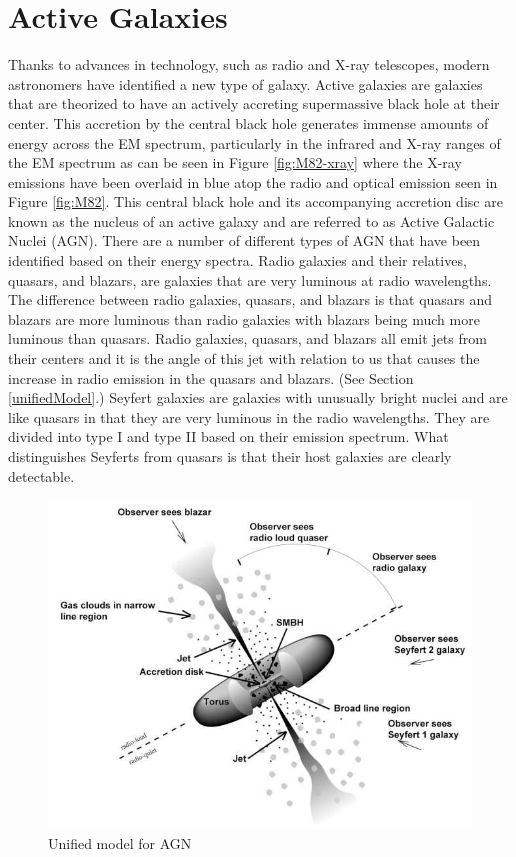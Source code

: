 \documentclass[12pt, oneside]{smuthesis}
\begin{document}
\section{\sc Active Galaxies} \label{activeGalaxies}

Thanks to advances in technology, such as radio and X-ray telescopes, modern astronomers have identified a new type of galaxy. Active galaxies are galaxies that are theorized to have an actively accreting supermassive black hole at their center. This accretion by the central black hole generates immense amounts of energy across the EM spectrum, particularly in the infrared and X-ray ranges of the EM spectrum as can be seen in Figure \ref{fig:M82-xray} where the X-ray emissions have been overlaid in blue atop the radio and optical emission seen in Figure \ref{fig:M82}. This central black hole and its accompanying accretion disc are known as the nucleus of an active galaxy and are referred to as Active Galactic Nuclei (AGN). There are a number of different types of AGN that have been identified based on their energy spectra. Radio galaxies and their relatives, quasars, and blazars, are galaxies that are very luminous at radio wavelengths. The difference between radio galaxies, quasars, and blazars is that quasars and blazars are more luminous than radio galaxies with blazars being much more luminous than quasars. Radio galaxies, quasars, and blazars all emit jets from their centers and it is the angle of this jet with relation to us that causes the increase in radio emission in the quasars and blazars. (See Section \ref{unifiedModel}.) Seyfert galaxies are galaxies with unusually bright nuclei and are like quasars in that they are very luminous in the radio wavelengths. They are divided into type I and type II based on their emission spectrum. What distinguishes Seyferts from quasars is that their host galaxies are clearly detectable.

\begin{figure}[H]
	\centering
	\includegraphics[width=0.6\linewidth]{UnifiedModel}
	\caption{Unified model for AGN \citep{unifiedmodel}}
	\label{fig:unifiedModel}
\end{figure}
\end{document}
